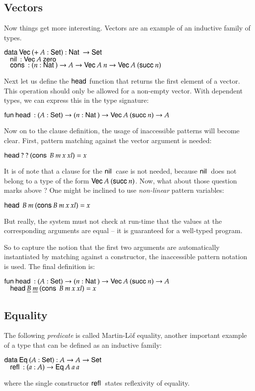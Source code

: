 \subsection{Vectors}
Now things get more interesting. Vectors are an example of an inductive family of types.
\begin{bsp}
$\mathsf{data}\: \mathsf{Vec}\: ( + \: A : \mathsf{Set} ) : \mathsf{Nat}\: \rightarrow \mathsf{Set} $ \\
$\hspace*{3mm} \mathsf{nil}\: : \mathsf{Vec}\: A \: \mathsf{zero}\:  $\\
$ \hspace*{3mm} \mathsf{cons}\: : ( n : \mathsf{Nat}\: ) \rightarrow{ A \rightarrow\mathsf{Vec}\:A \: n \rightarrow\mathsf{Vec}\:A \: (\mathsf{succ}\:n)} $
\end{bsp}
Next let us define the $\mathsf{head}$ function that returns the first element of a vector. This operation should only be allowed for a non-empty vector.
With dependent types, we can express this in the type signature:
\begin{bsp}
$ \mathsf{fun}\: \mathsf{head}\: : ( A : \mathsf{Set} ) \rightarrow ( n : \mathsf{Nat}\: ) \rightarrow \mathsf{Vec}\: A \: (\mathsf{succ}\: n) \rightarrow A $
\end{bsp}
Now on to the clause definition, the usage of inaccessible patterns will become clear.
First, pattern matching against the vector argument is needed:
\begin{bsp}
$\mathsf{head}\: ? \: ? \: (\mathsf{cons}\: \: B \: m \: x \: xl) = x $
\end{bsp}
It is of note that a clause for the $\mathsf{nil}\:$ case is not needed, because $\mathsf{nil}\:$ does not belong to a type of the form $\mathsf{Vec}\: A \: (\mathsf{succ}\: n)$.
Now, what about those question marks above ? 
One might be inclined to use \emph{non-linear} pattern variables:
\begin{bsp}
$\mathsf{head}\: \: B \: m \: (\mathsf{cons}\:  B \: m \: x \: xl) = x $
\end{bsp}
But really, the system must not check at run-time that the values at the corresponding arguments are equal -- it is guaranteed for a well-typed program.

So to capture the notion that the first two arguments are automatically instantiated by matching against a constructor, the inaccessible pattern notation \cite{norell:thesis,GoguHMcBrCM2006} is used. The final definition is:
\begin{bsp}
$ \mathsf{fun}\: \mathsf{head}\: : ( A : \mathsf{Set} ) \rightarrow ( n : \mathsf{Nat}\: ) \rightarrow \mathsf{Vec}\: A \: (\mathsf{succ}\: n) \rightarrow A $\\
$ \hspace*{3mm} \mathsf{head}\: \underline{B} \: \underline{m} \: (\mathsf{cons}\: \: B \: m \: x \: xl) = x $
\end{bsp}
\subsection{Equality}
The following \emph{predicate} is called Martin-L\"of equality, another important example of a type that can be defined as an inductive family:
\begin{bsp}
$\mathsf{data}\: \mathsf{Eq}\: ( A : \mathsf{Set} ) : A \rightarrow A \rightarrow \mathsf{Set} $ \\
$\hspace*{3mm} \mathsf{refl}\: : ( a : A ) \rightarrow{\mathsf{Eq}\:A \: a \: a}$
\end{bsp}
where the single constructor $\mathsf{refl}\:$ states reflexivity of equality.

